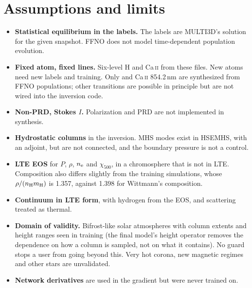 \section{Assumptions and limits}
\begin{itemize}
\item \textbf{Statistical equilibrium in the labels.} The labels are MULTI3D's solution for the given snapshot. FFNO does not model time-dependent population evolution.
\item \textbf{Fixed atom, fixed lines.} Six-level H and Ca\,\textsc{ii} from these files. New atoms need new labels and training. Only \Halpha{} and Ca\,\textsc{ii} 854.2\,nm are synthesized from FFNO populations; other transitions are possible in principle but are not wired into the inversion code.
\item \textbf{Non-PRD, Stokes $I$.} Polarization and PRD are not implemented in synthesis.
\item \textbf{Hydrostatic columns} in the inversion. MHS modes exist in HSEMHS, with an adjoint, but are not connected, and the boundary pressure is not a control.
\item \textbf{LTE EOS} for $P$, $\rho$, $n_{\rm e}$ and $\chi_{500}$, in a chromosphere that is not in LTE. Composition also differs slightly from the training simulations, whose $\rho/(n_{\rm H}m_{\rm H})$ is 1.357, against 1.398 for Wittmann's composition.
\item \textbf{Continuum in LTE form}, with hydrogen from the EOS, and scattering treated as thermal.
\item \textbf{Domain of validity.} Bifrost-like solar atmospheres with column extents and height ranges seen in training (the final model's height operator removes the dependence on how a column is sampled, not on what it contains). No guard stops a user from going beyond this. Very hot corona, new magnetic regimes and other stars are unvalidated.
\item \textbf{Network derivatives} are used in the gradient but were never trained on.
\end{itemize}

\appendix
